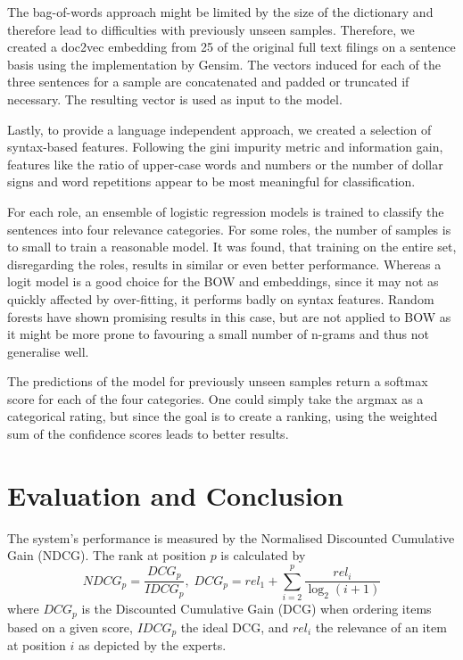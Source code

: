 The bag-of-words approach might be limited by the size of the dictionary and therefore lead to difficulties with previously unseen samples.
Therefore, we created a doc2vec\cite{le2014distributed} embedding from 25 of the original full text filings on a sentence basis using the implementation by Gensim\cite{gensim}.
The vectors induced for each of the three sentences for a sample are concatenated and padded or truncated if necessary.
The resulting vector is used as input to the model.

Lastly, to provide a language independent approach, we created a selection of syntax-based features.
Following the gini impurity metric and information gain, features like the ratio of upper-case words and numbers or the number of dollar signs and word repetitions appear to be most meaningful for classification.

For each role, an ensemble of logistic regression models is trained to classify the sentences into four relevance categories.
For some roles, the number of samples is to small to train a reasonable model.
It was found, that training on the entire set, disregarding the roles, results in similar or even better performance.
Whereas a logit model is a good choice for the BOW and embeddings, since it may not as quickly affected by over-fitting, it performs badly on syntax features.
Random forests have shown promising results in this case, but are not applied to BOW as it might be more prone to favouring a small number of n-grams and thus not generalise well.

The predictions of the model for previously unseen samples return a softmax score for each of the four categories.
One could simply take the argmax as a categorical rating, but since the goal is to create a ranking, using the weighted sum of the confidence scores leads to better results.

\section{Evaluation and Conclusion}
The system's performance is measured by the Normalised Discounted Cumulative Gain (NDCG). The rank at position $p$ is calculated by
\begin{equation}
NDCG_p = \frac{DCG_p}{IDCG_p},\;
DCG_p = rel_1 + \sum_{i=2}^{p} \frac{rel_i}{\log_2(i+1)}
\end{equation}
where $DCG_p$ is the Discounted Cumulative Gain (DCG) when ordering items based on a given score, $IDCG_p$ the ideal DCG, and $rel_i$ the relevance of an item at position $i$ as depicted by the experts.

